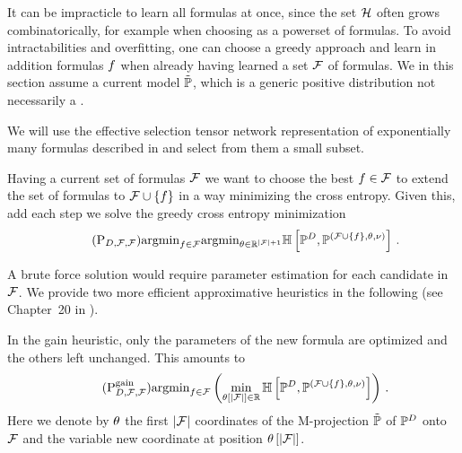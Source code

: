 








It can be impracticle to learn all formulas at once, since the set $\mathcal{H}$ often grows combinatorically, for example when choosing as a powerset of formulas.
To avoid intractabilities and overfitting, one can choose a greedy approach and learn in addition formulas $f$ when already having learned a set $\mathcal{F}$ of formulas.
We in this section assume a current model $\tilde{\mathbb{P}}$, which is a generic positive distribution not necessarily a \MarkovLogicNetwork{}. %

% 
We will use the effective selection tensor network representation of exponentially many formulas described in  and select from them a small subset.




Having a current set of formulas $\mathcal{F}$ we want to choose the best $f\in\mathcal{F}$ to extend the set of formulas to $\mathcal{F}\cup\{f\}$ in a way minimizing the cross entropy.
Given this, add each step we solve the greedy cross entropy minimization
\begin{align}
    \label{prob:perfectGreedy}\tag{$\mathrm{P}_{\datamap,\formulaset,\fselectionmap}$}
    \argmin_{\formula\in\fselectionmap} \argmin_{\canparam\in\rr^{\cardof{\formulaset}+1}}
    \centropyof{\empdistribution}{\expdistof{(\formulaset\cup\{\formula\},\canparam,\basemeasure)}} \, .
\end{align}


A brute force solution would require parameter estimation for each candidate in $\mathcal{F}$.
We provide two more efficient approximative heuristics in the following (see Chapter~20 in \cite{koller_probabilistic_2009}).



In the gain heuristic, only the parameters of the new formula are optimized and the others left unchanged.
This amounts to
\begin{align}
    \label{prob:greedyGain}\tag{$\mathrm{P}^{\mathrm{gain}}_{\datamap,\formulaset,\fselectionmap}$}
    \argmin_{\formula\in\fselectionmap} \left ( \min_{\canparamat{\cardof{\formulaset}}\in\rr}
    \centropyof{\empdistribution}{\expdistof{(\formulaset\cup\{\formula\},\canparam,\basemeasure)}} \right) \, .
\end{align}
Here we denote by $\theta$ the first $\left|\mathcal{F}\right|$ coordinates of the M-projection $\tilde{\mathbb{P}}$  of $\mathbb{P}^{D}$ onto $\mathcal{F}$ and the variable new coordinate at position $\theta\left[\left|\mathcal{F}\right|\right]$.


